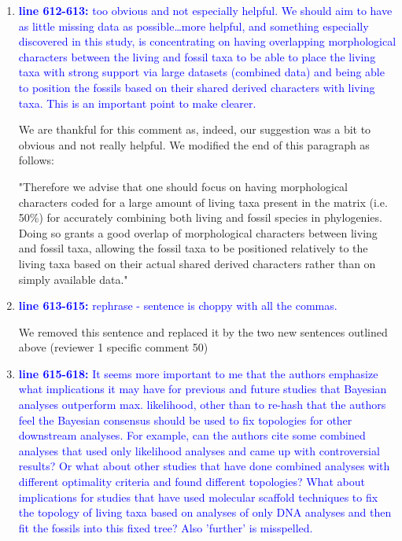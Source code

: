 \documentclass[12pt,letterpaper]{article}
\begin{document}
\begin{enumerate}
\item{\textcolor{blue}{\textbf{line 612-613:} too obvious and not especially helpful. We should aim to have as little missing data as possible…more helpful, and something especially discovered in this study, is concentrating on having overlapping morphological characters between the living and fossil taxa to be able to place the living taxa with strong support via large datasets (combined data) and being able to position the fossils based on their shared derived characters with living taxa. This is an important point to make clearer. }}

We are thankful for this comment as, indeed, our suggestion was a bit to obvious and not really helpful. We modified the end of this paragraph as follows:

"Therefore we advise that one should focus on having morphological characters coded for a large amount of living taxa present in the matrix (i.e. 50\%) for accurately combining both living and fossil species in phylogenies.
Doing so grants a good overlap of morphological characters between living and fossil taxa, allowing the fossil taxa to be positioned relatively to the living taxa based on their actual shared derived characters rather than on simply available data."


\item{\textcolor{blue}{\textbf{line 613-615:} rephrase - sentence is choppy with all the commas. }}

We removed this sentence and replaced it by the two new sentences outlined above (reviewer 1 specific comment 50)

\item{\textcolor{blue}{\textbf{line 615-618:} It seems more important to me that the authors emphasize what implications it may have for previous and future studies that Bayesian analyses outperform max. likelihood, other than to re-hash that the authors feel the Bayesian consensus should be used to fix topologies for other downstream analyses.
For example, can the authors cite some combined analyses that used only likelihood analyses and came up with controversial results?
Or what about other studies that have done combined analyses with different optimality criteria and found different topologies?
What about implications for studies that have used molecular scaffold techniques to fix the topology of living taxa based on analyses of only DNA analyses and then fit the fossils into this fixed tree?
Also 'further' is misspelled.  }}


\end{enumerate}
\end{document}
